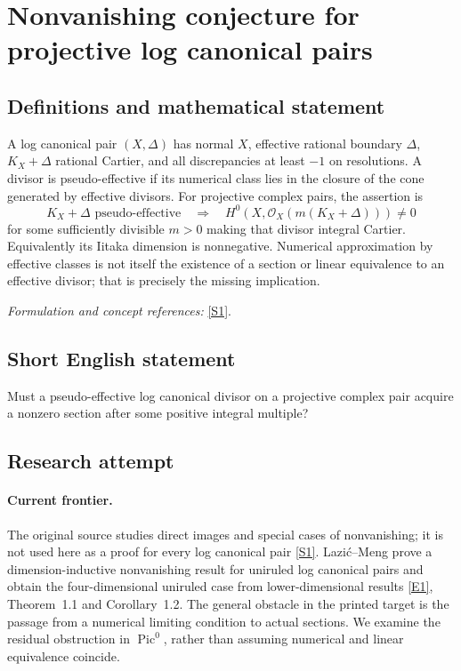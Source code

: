 \documentclass[11pt,a4paper]{article}
\newcommand{\sref}[2]{\hyperlink{source:#1:#2}{[S#2]}}
\newcommand{\eref}[2]{\hyperlink{extra:#1:#2}{[E#2]}}
\newif\ifshowcatalogue
\newcommand{\cataloguescope}[1]{\ifshowcatalogue
 \paragraph{Exact scope in the supplied catalogue.}
 \begin{quote}\small #1\end{quote}\fi}
\numberwithin{equation}{section}
\begin{document}
\setcounter{section}{0}
\clearpage
\section*{\texorpdfstring{Nonvanishing conjecture for projective log canonical pairs}{Nonvanishing conjecture for projective log canonical pairs}}\label{statement}
\subsection{Definitions and mathematical statement}
A log canonical pair $(X,\Delta)$ has normal $X$, effective rational boundary $\Delta$, $K_X+\Delta$ rational Cartier, and all discrepancies at least $-1$ on resolutions. A divisor is pseudo-effective if its numerical class lies in the closure of the cone generated by effective divisors. For projective complex pairs, the assertion is
\[
 K_X+\Delta\text{ pseudo-effective}
 \quad\Longrightarrow\quad
 H^0(X,\mathcal O_X(m(K_X+\Delta)))\ne0
\]
for some sufficiently divisible $m>0$ making that divisor integral Cartier. Equivalently its Iitaka dimension is nonnegative. Numerical approximation by effective classes is not itself the existence of a section or linear equivalence to an effective divisor; that is precisely the missing implication.
\par\smallskip\textit{Formulation and concept references:} \sref{statement}{1}.
\cataloguescope{Let (X, Delta) be a projective log canonical pair over the complex numbers, with Delta a Q-divisor and K\_X+Delta Q-Cartier. If K\_X+Delta is pseudo-effective, prove that kappa(K\_X+Delta) >= 0; equivalently, some sufficiently divisible positive multiple of K\_X+Delta is linearly equivalent to an effective divisor.}
\subsection{Short English statement}
Must a pseudo-effective log canonical divisor on a projective complex pair acquire a nonzero section after some positive integral multiple?
\subsection{Research attempt}

\paragraph{Current frontier.}
The original source studies direct images and special cases of nonvanishing; it is not used here as a proof for every log canonical pair \sref{statement}{1}. Lazi\'c--Meng prove a dimension-inductive nonvanishing result for uniruled log canonical pairs and obtain the four-dimensional uniruled case from lower-dimensional results \eref{statement}{1}, Theorem~1.1 and Corollary~1.2. The general obstacle in the printed target is the passage from a numerical limiting condition to actual sections. We examine the residual obstruction in $\operatorname{Pic}^0$, rather than assuming numerical and linear equivalence coincide.
\end{document}
